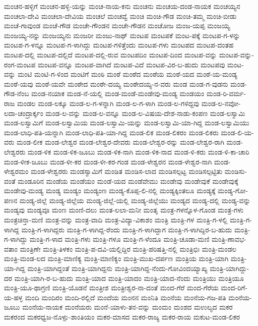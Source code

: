 ಮಂಚನ-ಹಳ್ಳಿಗೆ
ಮಂಚನ-ಹಳ್ಳಿ-ಯನ್ನು
ಮಂಚ-ನಾಯ-ಕನು
ಮಂಚನು
ಮಂಚಯ-ದಂಡ-ನಾಯಕ
ಮಂಚಯ್ಯನ
ಮಂಚಲಾ-ದೇವಿ
ಮಂಚಲಾ-ದೇವಿಯ
ಮಂಚಲೆ
ಮಂಚವ್ವೆ
ಮಂಚಿ
ಮಂಚಿ-ಗೌಡ
ಮಂಚಿ-ತಮ್ಮ
ಮಂಚಿ-ಬೀಡು
ಮಂಚೆ-ಗಾವುಂಡ
ಮಂಚೆ-ಗೌಡ
ಮಂಚೇ-ಗೌಂಡನ
ಮಂಚೇ-ಗೌಡನ
ಮಂಚೋಜ
ಮಂಜ-ಯಪ್ಪ
ಮಂಜಯ್ಯ
ಮಂಜಯ್ಯ-ನನ್ನು
ಮಂಜಯ್ಯನು
ಮಂಜರೀ
ಮಂಜು-ನಾಥ್
ಮಂಟಪ
ಮಂಟಪಕೆ
ಮಂಟ-ಪಕ್ಕೆ
ಮಂಟಪ-ಗ-ಳನ್ನು
ಮಂಟಪ-ಗ-ಳನ್ನೂ
ಮಂಟಪ-ಗ-ಳಾಗಿದ್ದು
ಮಂಟಪ-ಗಳಿತ್ತೆಂದು
ಮಂಟಪ-ಗಳು
ಮಂಟಪದ
ಮಂಟಪ-ದಂತಹ
ಮಂಟಪ-ದಲ್ಲಿ
ಮಂಟಪ-ದಲ್ಲಿದೆ
ಮಂಟಪ-ದಲ್ಲಿ-ರುವ
ಮಂಟಪದಿಂ
ಮಂಟಪ-ದಿಂದ
ಮಂಟಪ-ವನ್ನು
ಮಂಟಪ-ವನ್ನು-ರಂಗ-ಮಂಟಪ
ಮಂಟಪ-ವನ್ನೂ
ಮಂಟಪ-ವಾಗಿದೆ
ಮಂಟಪ-ವಿದೆ
ಮಂಟಪ-ವಿರ-ಬ-ಹುದು
ಮಂಟಪವು
ಮಂಟ-ವನ್ನು
ಮಂಟಿ
ಮಂಟಿ-ಗ-ಳಿಂದ
ಮಂಟಿಗೆ
ಮಂಠಿ
ಮಂಠೆ
ಮಂಠೆದ
ಮಂಠೆಯ
ಮಂಠೆ-ಯದ
ಮಂಠೆ-ಯ-ಮಂಡ್ಯ
ಮಂಠೆ-ಯವು
ಮಂಠೆ-ಯವೇ
ಮಂಠೇದ
ಮಂಠೇ-ದಯ್ಯ
ಮಂಠೇದಯ್ಯ-ನ-ವರು
ಮಂಡ
ಮಂಡ-ಗ-ವುಡನು
ಮಂಡ-ಗೌಡ-ನೆಂಬ
ಮಂಡ-ನಯಾಕ
ಮಂಡ-ನೆ-ಯಲ್ಲಿ
ಮಂಡ-ಮಂಡೆ-ಮಂಡೇವು-ಮಂಡ್ಯ
ಮಂಡಯಂ
ಮಂಡ-ರಿ-ವರ್ಮ-ರಾಜ
ಮಂಡಲ
ಮಂಡ-ಲಕ್ಕೂ
ಮಂಡ-ಲ-ಗ-ಳನ್ನಾಗಿ
ಮಂಡ-ಲ-ಗ-ಳಾಗಿ
ಮಂಡ-ಲ-ಗಳಿದ್ದವು
ಮಂಡ-ಲ-ನವೋ-ಲದಾ-ಚಂದ್ರಾರ್ಕ್ಕಂ
ಮಂಡ-ಲ-ವನ್ನು
ಮಂಡ-ಲ-ವನ್ನೂ
ಮಂಡ-ಲ-ವಿಷಯ-ದೇಶ-ನಾಡು-ಕಂಪಣ
ಮಂಡ-ಲಸ್ವಾಮಿ
ಮಂಡ-ಲಸ್ವಾಮಿಗೆ
ಮಂಡ-ಲಸ್ವಾಮಿಯ
ಮಂಡ-ಲಸ್ವಾಮಿ-ಯನ್ನು
ಮಂಡ-ಲಸ್ವಾಮಿ-ಯಾ-ಗಿದ್ದ
ಮಂಡ-ಲಸ್ವಾಮಿಯು
ಮಂಡ-ಲಾಧಿ-ಪತಿ-ಯನ್ನಾಗಿ
ಮಂಡ-ಲಾಧಿ-ಪತಿ-ಯಾ-ಗಿದ್ದ
ಮಂಡ-ಲಿಕ
ಮಂಡ-ಲಿಕರಂ
ಮಂಡ-ಲಿಕರು
ಮಂಡ-ಲಿ-ಯ-ವರು
ಮಂಡ-ಲೀಕ
ಮಂಡ-ಲೇಶ್ವರ
ಮಂಡ-ಲೇಶ್ವರ-ದೇವರು
ಮಂಡ-ಲೇಶ್ವರ-ರನ್ನು
ಮಂಡ-ಲೇಶ್ವರ-ರಾಗಿ
ಮಂಡ-ಲೇಶ್ವರರು
ಮಂಡ-ಳಿಕ
ಮಂಡ-ಳಿಕ-ಜೂಬು
ಮಂಡ-ಳಿಕ-ನಾಗಿ
ಮಂಡ-ಳಿಕ-ನಾದ
ಮಂಡ-ಳಿ-ಕರು
ಮಂಡ-ಳಿ-ಕಾ-ಚಾರಿ
ಮಂಡ-ಳೀಕ-ಜೂಬು
ಮಂಡ-ಳೀ-ಕರ
ಮಂಡ-ಳೀ-ಕರ-ಗಂಡ
ಮಂಡ-ಳೇಶ್ವರನ
ಮಂಡ-ಳೇಶ್ವರ-ನಾಗಿ
ಮಂಡ-ಳೇಶ್ವರಮಂ
ಮಂಡ-ಳೇಶ್ವರರು
ಮಂಡಸ್ವಾಮಿಗೆ
ಮಂಡಿತ
ಮಂಡಿಸ-ಲಾದ
ಮಂಡಿಸಲ್ಪಟ್ಟ
ಮಂಡಿಸಲ್ಪಟ್ಟಿತು
ಮಂಡಿಸು-ವಂತೆ
ಮಂಡೂರಿನ
ಮಂಡೆಯ
ಮಂಡೆಯಂ
ಮಂಡೆ-ಯದ
ಮಂಡೆವೇಮು
ಮಂಡೇವು
ಮಂಡೇವುಕೆ
ಮಂಡೇವುಕ್ಕೆ
ಮಂಡೇವು-ಮಂಡ್ಯ
ಮಂಡ್ಯ
ಮಂಡ್ಯಂ
ಮಂಡ್ಯಂಣ
ಮಂಡ್ಯ-ಕೊಪ್ಪ-ಲಿ-ನಲ್ಲಿ
ಮಂಡ್ಯಕ್ಕಿಂತಲೂ
ಮಂಡ್ಯಕ್ಕೆ
ಮಂಡ್ಯ-ಗೋ-ಪಣನ
ಮಂಡ್ಯ-ಜಿಲ್ಲೆ
ಮಂಡ್ಯ-ಜಿಲ್ಲೆಯ
ಮಂಡ್ಯ-ಜಿಲ್ಲೆ-ಯಲ್ಲಿ
ಮಂಡ್ಯ-ಜಿಲ್ಲೆಯು
ಮಂಡ್ಯದ
ಮಂಡ್ಯ-ದಲ್ಲಿ
ಮಂಡ್ಯ-ವನ್ನು
ಮಂಡ್ಯವು
ಮಂಡ್ಯವೂ
ಮಂಣ
ಮಂಣಿ-ದಲು
ಮಂತ-ಲಲಾ-ಮನೀ
ಮಂತೃ
ಮಂತ್ರ-ಗಳನ್ನೊಳ-ಗೊಂಡ
ಮಂತ್ರ-ಗಳು
ಮಂತ್ರಚಿನ್ತಾ-ಮಣಿ
ಮಂತ್ರ-ವನ್ನು
ಮಂತ್ರ-ವಾದಿ
ಮಂತ್ರ-ವಿದ್ಯಾ-ವಿಕಾಶಂ
ಮಂತ್ರಿ
ಮಂತ್ರಿ-ಗಳ
ಮಂತ್ರಿ-ಗ-ಳಲ್ಲಿ
ಮಂತ್ರಿ-ಗ-ಳಾಗಿದ್ದ
ಮಂತ್ರಿ-ಗ-ಳಾಗಿದ್ದರು
ಮಂತ್ರಿ-ಗ-ಳಾಗಿದ್ದ-ರೆಂದು
ಮಂತ್ರಿ-ಗ-ಳಾಗಿದ್ದಾಗ
ಮಂತ್ರಿ-ಗ-ಳಾಗಿದ್ದಿರ-ಬ-ಹುದು
ಮಂತ್ರಿ-ಗ-ಳಾಗಿದ್ದು
ಮಂತ್ರಿ-ಗ-ಳಾದ
ಮಂತ್ರಿ-ಗಳು
ಮಂತ್ರಿ-ಗಳೂ
ಮಂತ್ರಿ-ಗ-ಳೆಂದೂ
ಮಂತ್ರಿ-ಚೂಡಾ-ಮಣಿ
ಮಂತ್ರಿ-ಣಾವಭ-ವತಾಂ
ಮಂತ್ರಿಣೇ
ಮಂತ್ರಿ-ತಿಳಕಂ
ಮಂತ್ರಿ-ಪ-ದವಿ-ಯಲ್ಲಿದ್ದಿರ
ಮಂತ್ರಿ-ಪರಿಷತ್ತಿ-ನಲ್ಲಿ
ಮಂತ್ರಿಭಿಃ
ಮಂತ್ರಿ-ಮಂಡಲ
ಮಂತ್ರಿ-ಮಂಡ-ಲದ
ಮಂತ್ರಿ-ಮಾಣಿಕ್ಯ
ಮಂತ್ರಿ-ಮಾಣಿಕ್ಯಂ
ಮಂತ್ರಿ-ಮುಖ-ದರ್ಪಣ
ಮಂತ್ರಿಯ
ಮಂತ್ರಿ-ಯಾಗಿ
ಮಂತ್ರಿ-ಯಾ-ಗಿದ್ದ
ಮಂತ್ರಿ-ಯಾಗಿದ್ದಂತೆ
ಮಂತ್ರಿ-ಯಾಗಿದ್ದನು
ಮಂತ್ರಿ-ಯಾಗಿದ್ದ-ನೆಂದು-ಗೋವಿಂದಯ್ಯಾಖ್ಯ
ಮಂತ್ರಿ-ಯಾಗಿದ್ದು-ದರ
ಮಂತ್ರಿ-ಯಾಗಿ-ರ-ಬ-ಹುದು
ಮಂತ್ರಿ-ಯಾದ
ಮಂತ್ರಿ-ಯಾದಂ
ಮಂತ್ರಿ-ಯಾದ-ನೆಂದು
ಮಂತ್ರಿಯು
ಮಂತ್ರಿಯೂ
ಮಂತ್ರಿ-ಯೂ-ಥಾಗ್ರಣಿ
ಮಂತ್ರಿ-ಯೊಡನೆ
ಮಂತ್ರೀಶ
ಮಂತ್ರೀಶ್ವರ-ನಾ-ದಂತೆ
ಮಂದ-ಗೆರೆ
ಮಂದ-ಗೆರೆಯ
ಮಂದ-ರಿಗೆ-ಯ-ಹಳ್ಳ
ಮಂದಿ
ಮಂದಿರಂ
ಮಂದಿ-ರಲ್ಲಿದೆ
ಮಂದೆಯ
ಮಂನನ
ಮಂನಿತಿ
ಮಂನೆಯ
ಮಂನೆಯ-ಗಜ-ಪತಿ
ಮಂನೆಯ-ಜೂಬು
ಮಂನೆಯ-ನಾಯಕ
ಮಂನೆಯರು
ಮಂನೆ-ಯಾಳು-ತನ-ವನ್ನು
ಮಂಮಂ
ಮಂಶದ
ಮಉಲ್ಯದ
ಮಕರ
ಮಕರಂದ
ಮಕರಧ್ವಜ-ನೊಳ್ಸು-ಶಾಂತಿಯಂ
ಮಕರ-ಮಾಸದ
ಮಕರ-ರಾಜ್ಯ
ಮಕರ-ರಾಯ
ಮಕುಟ-ಮಂಡ-ಲಿಕರ
